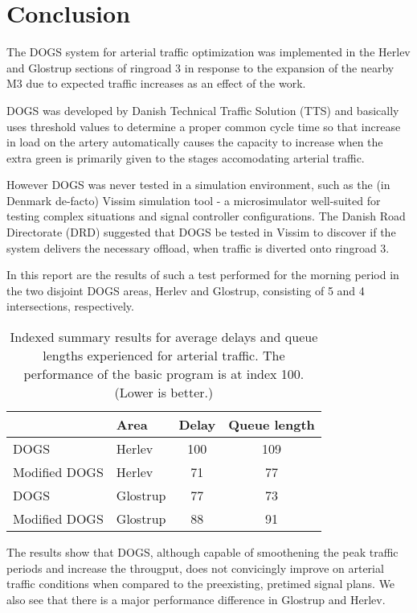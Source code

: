 \section{Conclusion}
\label{conclusion}

The DOGS system for arterial traffic optimization was implemented in the Herlev and Glostrup sections of ringroad 3 in response to the expansion of the nearby M3 due to expected traffic increases as an effect of the work.

DOGS was developed by Danish Technical Traffic Solution (TTS) and basically uses threshold values to determine a proper common cycle time so that increase in load on the artery automatically causes the capacity to increase when the extra green is primarily given to the stages accomodating arterial traffic.

However DOGS was never tested in a simulation environment, such as the (in Denmark de-facto) Vissim simulation tool - a microsimulator well-suited for testing complex situations and signal controller configurations.
The Danish Road Directorate (DRD) suggested that DOGS be tested in Vissim to discover if the system delivers the necessary offload, when traffic is diverted onto ringroad 3.

In this report are the results of such a test performed for the morning period in the two disjoint DOGS areas, Herlev and Glostrup, consisting of 5 and 4 intersections, respectively. 

\begin{table}[ht]
\centering
\begin{tabular}{l|l|c|c}
& \textbf{Area} & \textbf{Delay} & \textbf{Queue length} \\ \hline
DOGS & Herlev & 100 & 109 \\
Modified DOGS & Herlev & 71 & 77 \\
DOGS & Glostrup & 77 &  73 \\
Modified DOGS & Glostrup & 88 & 91
\end{tabular}
\caption{Indexed summary results for average delays and queue lengths experienced for arterial traffic. The performance of the basic program is at index 100. (Lower is better.)}
\label{tab:result_summary}
\end{table}

The results show that DOGS, although capable of smoothening the peak traffic periods and increase the througput, does not convicingly improve on arterial traffic conditions when compared to the preexisting, pretimed signal plans. We also see that there is a major performance difference in Glostrup and Herlev.

